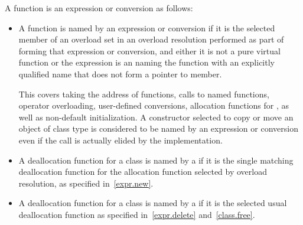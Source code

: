 \pnum
A function is 
an expression or conversion as follows:
\begin{itemize}
\item
  A function is named by an expression or conversion
  if it is the selected member
  of an overload set
  in an overload resolution performed
  as part of forming that expression or conversion,
  and either
  it is not a pure virtual function or
  the expression is an  naming the function with
  an explicitly qualified name
  that does not form a pointer to member.
  \begin{note}
This covers
  taking the address of functions,
  calls to named functions,
  operator overloading,
  user-defined conversions,
  allocation functions for , as well as
  non-default initialization.
  A constructor selected to copy or move an object of class type
  is considered to be named by an expression or conversion
  even if the call is actually elided by the implementation.
\end{note}
\item
  A deallocation function for a class
  is named by a 
  if it is the single matching deallocation function
  for the allocation function selected by overload resolution,
  as specified in~\ref{expr.new}.
\item
  A deallocation function for a class
  is named by a 
  if it is the selected usual deallocation function
  as specified in~\ref{expr.delete} and~\ref{class.free}.
\end{itemize}

